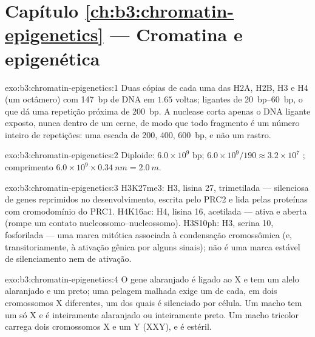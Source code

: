 \section*{Capítulo \ref{ch:b3:chromatin-epigenetics} --- Cromatina e epigenética}

\begin{solution}{exo:b3:chromatin-epigenetics:1}
Duas cópias de cada uma das  H2A, H2B, H3 e H4 (um octâmero)
com \qty{147}{bp} de DNA em $1.65$ voltas; ligantes de
\qtyrange{20}{60}{bp}, o que dá uma repetição próxima de \qty{200}{bp}.
A nuclease corta apenas o DNA ligante exposto, nunca dentro de um
cerne, de modo que todo fragmento é um número inteiro de repetições:
uma escada de \num{200}, \num{400}, \qty{600}{bp}, e não um rastro.
\end{solution}

\begin{solution}{exo:b3:chromatin-epigenetics:2}
Diploide: $6.0\times 10^{9}$ bp; $6.0\times 10^{9}/190 \approx
3.2\times 10^{7}$ ; comprimento $6.0\times 10^{9}\times
\qty{0.34}{nm} = \qty{2.0}{m}$.
\end{solution}

\begin{solution}{exo:b3:chromatin-epigenetics:3}
H3K27me3:  H3, lisina 27, trimetilada ---  silenciosa
de genes reprimidos no desenvolvimento, escrita pelo PRC2 e lida pelas
proteínas com cromodomínio do PRC1. H4K16ac: H4, lisina 16, acetilada
---  ativa e aberta (rompe um contato
nucleossomo--nucleossomo). H3S10ph: H3, serina 10, fosforilada --- uma
marca mitótica associada à condensação cromossômica (e,
transitoriamente, à ativação gênica por alguns sinais); não é uma
marca estável de silenciamento nem de ativação.
\end{solution}

\begin{solution}{exo:b3:chromatin-epigenetics:4}
O gene alaranjado é ligado ao X e tem um alelo alaranjado e um preto;
uma pelagem malhada exige um de cada, em dois cromossomos X
diferentes, um dos quais é silenciado por célula. Um macho tem um só X
e é inteiramente alaranjado ou inteiramente preto. Um macho tricolor
carrega dois cromossomos X e um Y (XXY), e é estéril.
\end{solution}

